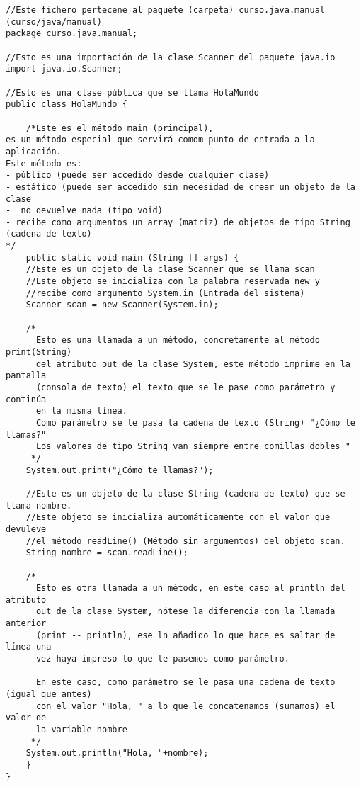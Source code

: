 \documentclass[11pt]{article}
\begin{document}
\begin{verbatim}
//Este fichero pertecene al paquete (carpeta) curso.java.manual (curso/java/manual)
package curso.java.manual;

//Esto es una importación de la clase Scanner del paquete java.io
import java.io.Scanner;

//Esto es una clase pública que se llama HolaMundo
public class HolaMundo {

    /*Este es el método main (principal), 
es un método especial que servirá comom punto de entrada a la aplicación. 
Este método es:
- público (puede ser accedido desde cualquier clase)
- estático (puede ser accedido sin necesidad de crear un objeto de la clase
-  no devuelve nada (tipo void)
- recibe como argumentos un array (matriz) de objetos de tipo String (cadena de texto)
*/
    public static void main (String [] args) {
	//Este es un objeto de la clase Scanner que se llama scan
	//Este objeto se inicializa con la palabra reservada new y
	//recibe como argumento System.in (Entrada del sistema)
	Scanner scan = new Scanner(System.in);

	/*
	  Esto es una llamada a un método, concretamente al método print(String)
	  del atributo out de la clase System, este método imprime en la pantalla
	  (consola de texto) el texto que se le pase como parámetro y continúa
	  en la misma línea.
	  Como parámetro se le pasa la cadena de texto (String) "¿Cómo te llamas?"
	  Los valores de tipo String van siempre entre comillas dobles "
	 */
	System.out.print("¿Cómo te llamas?");

	//Este es un objeto de la clase String (cadena de texto) que se llama nombre.
	//Este objeto se inicializa automáticamente con el valor que devuleve
	//el método readLine() (Método sin argumentos) del objeto scan.
	String nombre = scan.readLine();

	/*
	  Esto es otra llamada a un método, en este caso al println del atributo
	  out de la clase System, nótese la diferencia con la llamada anterior
	  (print -- println), ese ln añadido lo que hace es saltar de línea una
	  vez haya impreso lo que le pasemos como parámetro.

	  En este caso, como parámetro se le pasa una cadena de texto (igual que antes)
	  con el valor "Hola, " a lo que le concatenamos (sumamos) el valor de 
	  la variable nombre
	 */
	System.out.println("Hola, "+nombre);
    }
}
\end{verbatim}
\end{document}
